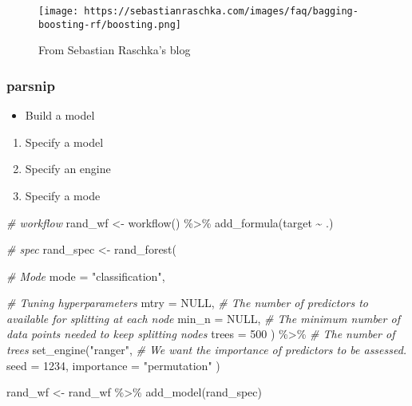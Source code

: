 \documentclass[
]{book}
\newenvironment{Shaded}{\begin{snugshade}}{\end{snugshade}}
\newcommand{\AttributeTok}[1]{\textcolor[rgb]{0.77,0.63,0.00}{#1}}
\newcommand{\CommentTok}[1]{\textcolor[rgb]{0.56,0.35,0.01}{\textit{#1}}}
\newcommand{\ConstantTok}[1]{\textcolor[rgb]{0.00,0.00,0.00}{#1}}
\newcommand{\DecValTok}[1]{\textcolor[rgb]{0.00,0.00,0.81}{#1}}
\newcommand{\FunctionTok}[1]{\textcolor[rgb]{0.00,0.00,0.00}{#1}}
\newcommand{\NormalTok}[1]{#1}
\newcommand{\OtherTok}[1]{\textcolor[rgb]{0.56,0.35,0.01}{#1}}
\newcommand{\SpecialCharTok}[1]{\textcolor[rgb]{0.00,0.00,0.00}{#1}}
\newcommand{\StringTok}[1]{\textcolor[rgb]{0.31,0.60,0.02}{#1}}
\providecommand{\tightlist}{%
  \setlength{\itemsep}{0pt}\setlength{\parskip}{0pt}}
\begin{document}
\begin{figure}
\centering
\texttt{[image: https://sebastianraschka.com/images/faq/bagging-boosting-rf/boosting.png]}
\caption{From Sebastian Raschka's blog}
\end{figure}

\hypertarget{parsnip-2}{%
\subsubsection{parsnip}\label{parsnip-2}}

\begin{itemize}
\tightlist
\item
  Build a model
\end{itemize}

\begin{enumerate}
\def\labelenumi{\arabic{enumi}.}
\tightlist
\item
  Specify a model
\item
  Specify an engine
\item
  Specify a mode
\end{enumerate}

\begin{Shaded}
\begin{Highlighting}[]
\CommentTok{\# workflow}
\NormalTok{rand\_wf }\OtherTok{\textless{}{-}} \FunctionTok{workflow}\NormalTok{() }\SpecialCharTok{\%\textgreater{}\%} \FunctionTok{add\_formula}\NormalTok{(target }\SpecialCharTok{\textasciitilde{}}\NormalTok{ .)}

\CommentTok{\# spec}
\NormalTok{rand\_spec }\OtherTok{\textless{}{-}} \FunctionTok{rand\_forest}\NormalTok{(}

  \CommentTok{\# Mode}
  \AttributeTok{mode =} \StringTok{"classification"}\NormalTok{,}

  \CommentTok{\# Tuning hyperparameters}
  \AttributeTok{mtry =} \ConstantTok{NULL}\NormalTok{, }\CommentTok{\# The number of predictors to available for splitting at each node}
  \AttributeTok{min\_n =} \ConstantTok{NULL}\NormalTok{, }\CommentTok{\# The minimum number of data points needed to keep splitting nodes}
  \AttributeTok{trees =} \DecValTok{500}
\NormalTok{) }\SpecialCharTok{\%\textgreater{}\%} \CommentTok{\# The number of trees}
  \FunctionTok{set\_engine}\NormalTok{(}\StringTok{"ranger"}\NormalTok{,}
    \CommentTok{\# We want the importance of predictors to be assessed.}
    \AttributeTok{seed =} \DecValTok{1234}\NormalTok{,}
    \AttributeTok{importance =} \StringTok{"permutation"}
\NormalTok{  )}

\NormalTok{rand\_wf }\OtherTok{\textless{}{-}}\NormalTok{ rand\_wf }\SpecialCharTok{\%\textgreater{}\%} \FunctionTok{add\_model}\NormalTok{(rand\_spec)}
\end{Highlighting}
\end{Shaded}
\end{document}
